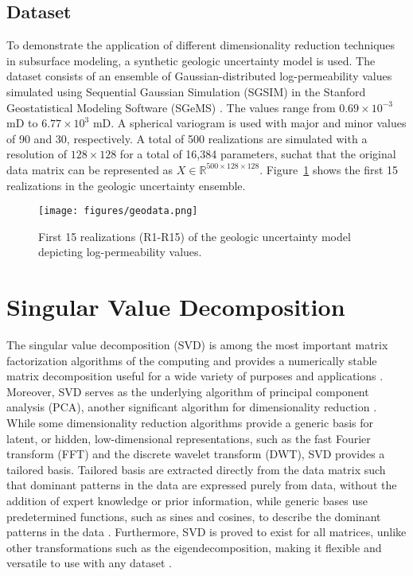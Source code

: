 \documentclass[a4paper,fleqn,12pt]{article}
\begin{document}
\subsection*{Dataset}
To demonstrate the application of different dimensionality reduction techniques in subsurface modeling, a synthetic geologic uncertainty model is used. The dataset consists of an ensemble of Gaussian-distributed log-permeability values simulated using Sequential Gaussian Simulation (SGSIM) in the Stanford Geostatistical Modeling Software (SGeMS) \cite{pyrcz2014geostatistical, pyrcz2024appliedgeostats, remy2009applied}. The values range from $0.69\times10^{-3}$ mD to $6.77\times10^3$ mD. A spherical variogram is used with major and minor values of 90 and 30, respectively. A total of 500 realizations are simulated with a resolution of $128\times128$ for a total of 16,384 parameters, suchat that the original data matrix can be represented as $X\in\mathbb{R}^{500\times128\times128}$. Figure~\ref{fig:geodata} shows the first 15 realizations in the geologic uncertainty ensemble.

\begin{figure}[H]
    \centering
    \texttt{[image: figures/geodata.png]}
    \caption{First 15 realizations (R1-R15) of the geologic uncertainty model depicting log-permeability values.}
    \label{fig:geodata}
\end{figure}

\pagebreak
\section*{Singular Value Decomposition}
The singular value decomposition (SVD) is among the most important matrix factorization algorithms of the computing and provides a numerically stable matrix decomposition useful for a wide variety of purposes and applications \cite{klema1980singular, stewart1993early}. Moreover, SVD serves as the underlying algorithm of principal component analysis (PCA), another significant algorithm for dimensionality reduction \cite{wall2003singular, baker2005singular}. While some dimensionality reduction algorithms provide a generic basis for latent, or hidden, low-dimensional representations, such as the fast Fourier transform (FFT) and the discrete wavelet transform (DWT), SVD provides a tailored basis. Tailored basis are extracted directly from the data matrix such that dominant patterns in the data are expressed purely from data, without the addition of expert knowledge or prior information, while generic bases use predetermined functions, such as sines and cosines, to describe the dominant patterns in the data \cite{brunton2022data, jafarpour2009reservoir}. Furthermore, SVD is proved to exist for all matrices, unlike other transformations such as the eigendecomposition, making it flexible and versatile to use with any dataset \cite{golub2013matrix}. 
\end{document}
